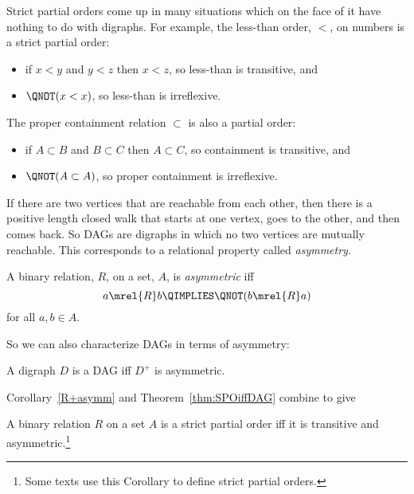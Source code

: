 Strict partial orders come up in many situations which on the face of
it have nothing to do with digraphs.  For example, the less-than
order, $<$, on numbers is a strict partial order:
\begin{itemize}
\item if $x <y$ and $y < z$ then $x < z$, so less-than is transitive, and
\item  $\QNOT(x < x)$, so less-than is irreflexive.
\end{itemize}
The proper containment relation $\subset$ is also a
partial order:
\begin{itemize}
\item if $A \subset B$ and $B \subset C$ then $A \subset C$,
so containment is transitive, and
\item  $\QNOT(A \subset A)$, so proper containment is irreflexive.
\end{itemize}

If there are two vertices that are reachable from each other, then
there is a positive length closed walk that starts at one vertex, goes
to the other, and then comes back.  So DAGs are digraphs in which no
two vertices are mutually reachable.  This corresponds to a relational
property called \emph{asymmetry}.

\begin{definition}
A binary relation, $R$, on a set, $A$, is \emph{asymmetric}%
iff
\[
a \mrel{R} b \QIMPLIES \QNOT(b \mrel{R} a)
\]
for all $a,b \in A$.
\end{definition}
So we can also characterize DAGs in terms of asymmetry:
\begin{corollary}\label{R+asymm}
A digraph $D$ is a DAG iff $D^+$ is asymmetric.
\end{corollary}

Corollary~\ref{R+asymm} and Theorem~\ref{thm:SPOiffDAG} combine to give
\begin{corollary}\label{cor:spoifftransasym}
A binary relation $R$ on a set $A$ is a strict partial order iff it is
transitive and asymmetric.\footnote{Some texts use this Corollary to
  define strict partial orders.}
\end{corollary}

\iffalse
can be an economical way to represent partial orders.  For example,
the \emph{direct prerequisite} relation between MIT subjects in
Chapter~\ref{partial-order-chapter} was used to determine the partial
order of indirect prerequisites on subjects.  This indirect
prerequisite partial order is precisely the positive length walk
relation of the direct prerequisites.
\fi

